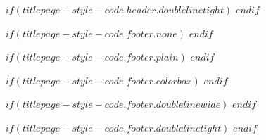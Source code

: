 $if(titlepage-style-code.header.doublelinetight)$
\newcommand{\titlepageheaderblock}{
\newcommand{\HRule}{\rule{\linewidth}{0.5mm}} 

\HRule\\[0.4cm]

\headerstyled

\HRule\\
}
$endif$

$if(titlepage-style-code.footer.none)$
\newcommand{\titlepagefooterblock}{}
$endif$

$if(titlepage-style-code.footer.plain)$
\newcommand{\titlepagefooterblock}{
\footerstyled
}
$endif$

$if(titlepage-style-code.footer.colorbox)$
\newcommand{\titlepagefooterblock}{
{\setlength{\fboxrule}{$if(titlepage-theme.footer-colorbox-borderwidth)$$titlepage-theme.footer-colorbox-borderwidth$$else$0pt$endif$}
\fcolorbox{$if(titlepage-theme.footer-colorbox-bordercolor)$$titlepage-theme.footer-colorbox-bordercolor$$else$black$endif$}{$if(titlepage-theme.footer-colorbox-fill)$$titlepage-theme.footer-colorbox-fill$$else$cyan$endif$}{
\parbox[t]{0.90\minipagewidth}{ %
\parbox[t]{0.85\minipagewidth}{ %
$if(titlepage-theme.footer-align)$\titlepagefooteralign$else$$if(titlepage-theme.page-align)$\titlepagepagealign$endif$$endif$
\vspace{0.7cm}

\footerstyled

\vspace{0.7cm}
}} %
} %
} %
}
$endif$

$if(titlepage-style-code.footer.doublelinewide)$
\newcommand{\titlepagefooterblock}{
\rule{\textwidth}{0.4pt} %
\vspace{0.1\textheight} %

\footerstyled

\vspace{0.025\textheight} 
\rule{0.3\textwidth}{0.4pt} %
}
$endif$

$if(titlepage-style-code.footer.doublelinetight)$
\newcommand{\titlepagefooterblock}{
\newcommand{\HRule}{\rule{\linewidth}{0.5mm}} 

\HRule\\[0.4cm]

\footerstyled

\HRule\\
}
$endif$

